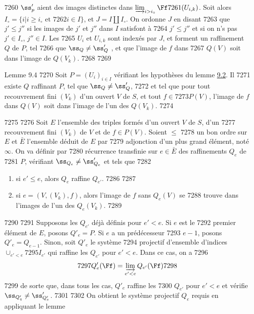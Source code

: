   7260	$\ss'_p$ aient des images distinctes dans $\varinjlim_{i > i_\circ} \Ff
  7261	(U_{i, k})$. Soit alors $I_{\circ} = \{i | i \geq i_{\circ} \mbox{ et }
  7262	  i \in I\}$, et $J = I \coprod I_{\circ}$. On ordonne $J$ en disant
  7263	que $j' \leq j''$ si les images de $j'$ et $j''$ dans $I$ satisfont à
  7264	$j' \leq j''$ et si on n's pas $j' \in I_{\circ}$, $j''\in I$. Les
  7265	$U_i$ et $U_{i, k}$ sont indexés par $J$, et forment un raffinement $Q$ de $P$, tel
  7266	que $\ss_Q \neq \ss'_Q$ , et que l'image de $f$ dans
  7267	$Q(V)$ soit dans l'image de $Q(V_k)$.
  7268	
  7269	\begin{enonce*}{Lemme 9.4}
  7270	Soit $P = (U_i)_{i \in I}$ vérifiant les hypothèses du lemme \hyperref[VI.lem9.2]{9.2}. Il
  7271	existe $Q$ raffinant $P$, tel que $\ss_Q \neq \ss'_Q$,
  7272	et tel que pour tout recouvrement fini $(V_k)$ d'un ouvert $V$ de $S$, et tout $f \in
  7273	P(V)$, l'image de $f$ dans $Q(V)$ soit dans l'image de l'un des $Q(V_k)$.
  7274	\end{enonce*}
  7275	
  7276	Soit $E$ l'ensemble des triples formés d'un ouvert $V$ de $S$, d'un
  7277	recouvrement fini $(V_k)$ de $V$ et de $f \in P(V)$. Soient $\leq$
  7278	un bon ordre sur $E$ et $\bar{E}$ l'ensemble déduit de $E$ par
  7279	adjonction d'un plus grand élément, noté $\infty$. On va définir par
  7280	récurrence transfinie sur $e \in \bar{E}$ des raffinements $Q_e$ de
  7281	$P$, vérifiant $\ss_{Q_e} \neq \ss'_{Q_e}$ et tels que
  7282	\begin{enumerate}
  7283	\renewcommand{\theenumi}{\roman{enumi}}
  7284	\renewcommand{\labelenumi}{(\theenumi)}
  7285	\item si $e'\leq e$, alors $Q_e$ raffine $Q_{e'}$.
  7286	
  7287	\item si $e = (V, (V_k), f)$, alors l'image de $f$ sans $Q_e(V)$ se
  7288	  trouve dans l'images de l'un des $Q_{e} (V_k)$.
  7289	\end{enumerate}
  7290	
  7291	Supposons les $Q_{e'}$ déjà définis pour $e'< e$. Si $e$ est le
  7292	premier élément de $E$, posons $Q'_e = P$. Si $e$ a un prédécesseur
  7293	$e-1$, posons $Q'_e = Q_{e-1}$. Sinon, soit $Q'_e$ le système
  7294	projectif d'ensemble d'indices $\cup_{e' < e}
  7295	I_{e'}$ qui raffine les $Q_{e'}$ pour $e' < e$. Dans ce cas, on a
  7296	$$
  7297	Q'_e (\Ff) = \varinjlim_{e' < e} Q_{e'} (\Ff)
  7298	$$
  7299	de \pageoriginale sorte que, dans tous les cas, $Q'_e$ raffine les
  7300	$Q_{e'}$ pour $e'< e$ et vérifie $\ss_{Q'_q} \neq \ss'_{Q'_e}$.
  7301	
  7302	On obtient le système projectif $Q_e$ requis en appliquant le lemme
